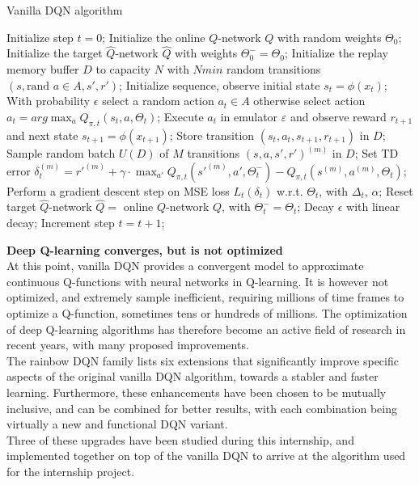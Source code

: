 \begin{algorithm}[H]
\small
\caption*{Vanilla DQN algorithm}
\begin{algorithmic}
    \STATE Initialize step $t = 0$;
    \STATE Initialize the online $Q$-network $Q$ with random weights $\Theta_0$;
    \STATE Initialize the target $\hat{Q}$-network $\hat{Q}$ with weights $\Theta^-_0 = \Theta_0$;
    \STATE Initialize the replay memory buffer $D$ to capacity $N$
    \STATE with $Nmin$ random transitions $(s,\text{rand }a \in A,s',r')$;
        \bindent
        \STATE Initialize sequence, observe initial state $s_t=\phi(x_t)$;
            \bindent
            \STATE With probability $\epsilon$ select a random action $a_t \in A$
            \STATE otherwise select action $a_t = arg\max_{a}Q_{\pi,t}(s_t,a,\Theta_t)$;
            \STATE Execute $a_t$ in emulator $\varepsilon$ and observe reward $r_{t+1}$ and next state $s_{t+1}=\phi(x_{t+1})$;
            \STATE Store transition $(s_t,a_t,s_{t+1},r_{t+1})$ in $D$;
            \STATE Sample random batch $U(D)$ of $M$ transitions $(s,a,s',r')^{(m)}$ in $D$;
                \bindent
                \STATE Set TD error $\delta^{(m)}_t = r'^{(m)} + \gamma \cdot \max_{a'}Q_{\pi,t}(s'^{(m)},a',\Theta^-_t) - Q_{\pi,t}(s^{(m)},a^{(m)},\Theta_t)$;
                \eindent
            \ENDFOR
            \STATE Perform a gradient descent step on MSE loss $L_t(\delta_t)$ w.r.t. $\Theta_t$,  with $\Delta_t$, $\alpha$;
                \bindent
                \STATE Reset target $\hat{Q}$-network $\hat{Q} = $ online $Q$-network $Q$, with $\Theta^-_t = \Theta_t$;
                \eindent
                \ENDIF
            \STATE Decay $\epsilon$ with linear decay;
            \STATE Increment step $t = t + 1$;
            \eindent
        \ENDWHILE
        \eindent
    \ENDFOR
\end{algorithmic}
\end{algorithm}

\textbf{Deep Q-learning converges, but is not optimized} \\
At this point, vanilla DQN provides a convergent model to approximate continuous Q-functions with neural networks in Q-learning. It is however not optimized, and extremely sample inefficient, requiring millions of time frames to optimize a Q-function, sometimes tens or hundreds of millions. The optimization of deep Q-learning algorithms has therefore become an active field of research in recent years, with many proposed improvements. \\
The rainbow DQN family lists six extensions that significantly improve specific aspects of the original vanilla DQN algorithm, towards a stabler and faster learning. Furthermore, these enhancements have been chosen to be mutually inclusive, and can be combined for better results, with each combination being virtually a new and functional DQN variant. \\
Three of these upgrades have been studied during this internship, and implemented together on top of the vanilla DQN to arrive at the algorithm used for the internship project.


